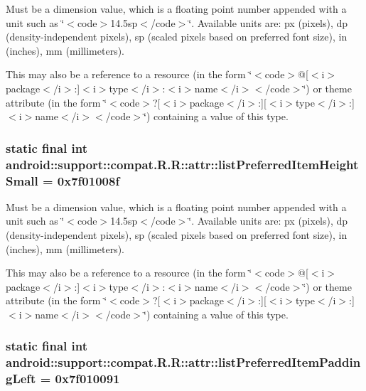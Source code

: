Must be a dimension value, which is a floating point number appended with a unit such as \char`\"{}$<$code$>$14.5sp$<$/code$>$\char`\"{}. Available units are: px (pixels), dp (density-independent pixels), sp (scaled pixels based on preferred font size), in (inches), mm (millimeters). 

This may also be a reference to a resource (in the form \char`\"{}$<$code$>$@\mbox{[}$<$i$>$package$<$/i$>$:\mbox{]}$<$i$>$type$<$/i$>$:$<$i$>$name$<$/i$>$$<$/code$>$\char`\"{}) or theme attribute (in the form \char`\"{}$<$code$>$?\mbox{[}$<$i$>$package$<$/i$>$:\mbox{]}\mbox{[}$<$i$>$type$<$/i$>$:\mbox{]}$<$i$>$name$<$/i$>$$<$/code$>$\char`\"{}) containing a value of this type. \hypertarget{classandroid_1_1support_1_1compat_1_1_r_1_1attr_b2f13f552ecc9a1c4fd528c1e9c3bcf3}{
\subsubsection[{listPreferredItemHeightSmall}]{\setlength{\rightskip}{0pt plus 5cm}static final int android::support::compat.R.R::attr::listPreferredItemHeightSmall = 0x7f01008f}}
\label{classandroid_1_1support_1_1compat_1_1_r_1_1attr_b2f13f552ecc9a1c4fd528c1e9c3bcf3}


Must be a dimension value, which is a floating point number appended with a unit such as \char`\"{}$<$code$>$14.5sp$<$/code$>$\char`\"{}. Available units are: px (pixels), dp (density-independent pixels), sp (scaled pixels based on preferred font size), in (inches), mm (millimeters). 

This may also be a reference to a resource (in the form \char`\"{}$<$code$>$@\mbox{[}$<$i$>$package$<$/i$>$:\mbox{]}$<$i$>$type$<$/i$>$:$<$i$>$name$<$/i$>$$<$/code$>$\char`\"{}) or theme attribute (in the form \char`\"{}$<$code$>$?\mbox{[}$<$i$>$package$<$/i$>$:\mbox{]}\mbox{[}$<$i$>$type$<$/i$>$:\mbox{]}$<$i$>$name$<$/i$>$$<$/code$>$\char`\"{}) containing a value of this type. \hypertarget{classandroid_1_1support_1_1compat_1_1_r_1_1attr_56adaee937edcb379d63828161413b74}{
\subsubsection[{listPreferredItemPaddingLeft}]{\setlength{\rightskip}{0pt plus 5cm}static final int android::support::compat.R.R::attr::listPreferredItemPaddingLeft = 0x7f010091}}
\label{classandroid_1_1support_1_1compat_1_1_r_1_1attr_56adaee937edcb379d63828161413b74}


